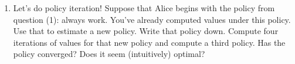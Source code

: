 \documentclass[fleqn]{hw}
\begin{document}
\begin{enumerate}
\item Let's do policy iteration!  Suppose that Alice
begins with the policy from question (1): always work.  You've already
computed values under this policy.  Use that to estimate a new policy.
Write that policy down.  Compute four iterations of values for that
new policy and compute a third policy.  Has the policy converged?
Does it seem (intuitively) optimal?

\end{enumerate}
\end{document}
